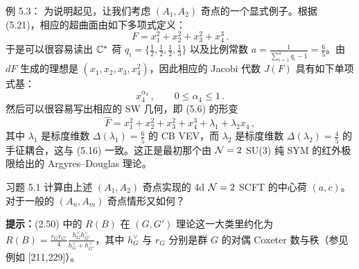 \begin{examplebox}{例 5.3：}
  为说明起见，让我们考虑 $(A_1,A_2)$ 奇点的一个显式例子。根据 (5.21)，相应的超曲面由如下多项式定义：
  \begin{equation}
    F = x_1^2+x_2^2+x_3^2+x_4^3\,.
    \tag{5.23}
  \end{equation}
  于是可以很容易读出 $\mathbb{C}^*$ 荷 $q_i=\{\tfrac12,\tfrac12,\tfrac12,\tfrac13\}$ 以及比例常数 $a=\frac{1}{\sum_{i=1}^{4}q_i-1}=\frac{6}{5}$。由 $dF$ 生成的理想是 $(x_1,x_2,x_3,x_4^2)$，因此相应的 Jacobi 代数 $J(F)$ 具有如下单项式基：
  \begin{equation}
    x_4^{\alpha_4}\,,\qquad 0\leqslant\alpha_4\leqslant 1\,.
    \tag{5.24}
  \end{equation}
  然后可以很容易写出相应的 SW 几何，即 (5.6) 的形变
  \begin{equation}
    \hat F = x_1^2+x_2^2+x_3^2+x_4^3+\lambda_1+\lambda_2x_4\,,
    \tag{5.25}
  \end{equation}
  其中 $\lambda_1$ 是标度维数 $\Delta(\lambda_1)=\frac65$ 的 CB VEV，而 $\lambda_2$ 是标度维数 $\Delta(\lambda_2)=\frac45$ 的手征耦合，这与 (5.16) 一致。这正是最初那个由 $\mathcal{N}=2$ SU(3) 纯 SYM 的红外极限给出的 Argyres--Douglas 理论。

\end{examplebox}

\begin{exercisebox}{习题 5.1}
  计算由上述 $(A_1,A_2)$ 奇点实现的 4d $\mathcal{N}=2$ SCFT 的中心荷 $(a,c)$。对于一般的 $(A_n,A_m)$ 奇点情形又如何？

  \textbf{提示：}(2.50) 中的 $R(B)$ 在 $(G,G')$ 理论这一大类里约化为 $R(B)=\frac{r_Gr_{G'}}{4}\frac{h^{\vee}_Gh^{\vee}_{G'}}{h^{\vee}_G+h^{\vee}_{G'}}$，其中 $h^{\vee}_G$ 与 $r_G$ 分别是群 $G$ 的对偶 Coxeter 数与秩（参见例如 [211,229]）。
\end{exercisebox}


